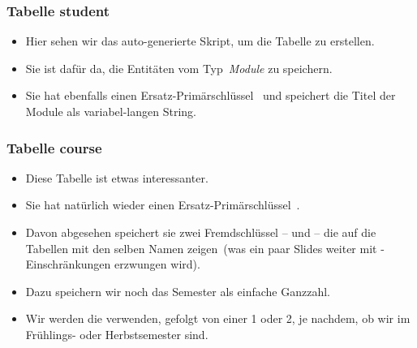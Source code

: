 \documentclass[aspectratio=169,mathserif,notheorems]{beamer}%
\begin{document}
%
\begin{frame}[t]%
\frametitle{Tabelle student}%
\parbox{0.435\linewidth}{\small%
\begin{itemize}%
%
\item Hier sehen wir das auto-generierte Skript, um die Tabelle  zu erstellen.%
%
\item<2-> Sie ist dafür da, die Entitäten vom Typ~\emph{Module} zu speichern.%
%
\item<3-> Sie hat ebenfalls einen Ersatz-Primärschlüssel~ und speichert die Titel der Module als variabel-langen String.%
%
\end{itemize}%
}%
%
\end{frame}%
%
\begin{frame}[t]%
\frametitle{Tabelle course}%
\parbox{0.435\linewidth}{\small%
\begin{itemize}%
%
%
%
\item<2-> Diese Tabelle ist etwas interessanter.%
%
\item<3-> Sie hat natürlich wieder einen Ersatz-Primärschlüssel~.%
%
\item<4-> Davon abgesehen speichert sie zwei Fremdschlüssel --  und  -- die auf die Tabellen mit den selben Namen zeigen~(was ein paar Slides weiter mit -Einschränkungen erzwungen wird).%
%
\item<5-> Dazu speichern wir noch das Semester als einfache Ganzzahl.%
%
\item<6-> Wir werden die  verwenden, gefolgt von einer 1 oder 2, je nachdem, ob wir im Frühlings- oder Herbstsemester sind.%
%
\end{itemize}%
}%
%
\end{frame}%
%
\end{document}
